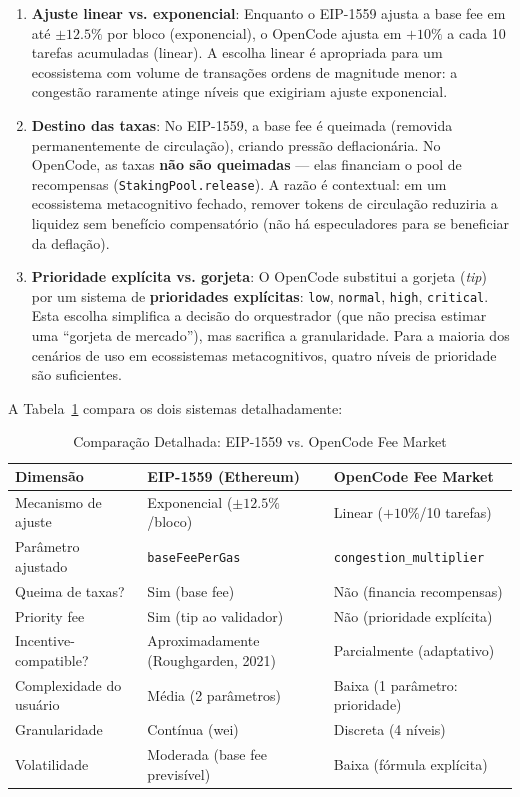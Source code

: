 \begin{enumerate}
    \item \textbf{Ajuste linear vs. exponencial}: Enquanto o EIP-1559 ajusta a base fee em até $\pm 12.5\%$ por bloco (exponencial), o OpenCode ajusta em $+10\%$ a cada 10 tarefas acumuladas (linear). A escolha linear é apropriada para um ecossistema com volume de transações ordens de magnitude menor: a congestão raramente atinge níveis que exigiriam ajuste exponencial.
    
    \item \textbf{Destino das taxas}: No EIP-1559, a base fee é queimada (removida permanentemente de circulação), criando pressão deflacionária. No OpenCode, as taxas \textbf{não são queimadas} --- elas financiam o pool de recompensas (\texttt{StakingPool.release}). A razão é contextual: em um ecossistema metacognitivo fechado, remover tokens de circulação reduziria a liquidez sem benefício compensatório (não há especuladores para se beneficiar da deflação).
    
    \item \textbf{Prioridade explícita vs. gorjeta}: O OpenCode substitui a gorjeta (\textit{tip}) por um sistema de \textbf{prioridades explícitas}: \texttt{low}, \texttt{normal}, \texttt{high}, \texttt{critical}. Esta escolha simplifica a decisão do orquestrador (que não precisa estimar uma ``gorjeta de mercado''), mas sacrifica a granularidade. Para a maioria dos cenários de uso em ecossistemas metacognitivos, quatro níveis de prioridade são suficientes.
\end{enumerate}

A Tabela~\ref{tab:eip1559_comparison_detailed} compara os dois sistemas detalhadamente:

\begin{table}[htbp]
\centering
\caption{Comparação Detalhada: EIP-1559 vs. OpenCode Fee Market}
\label{tab:eip1559_comparison_detailed}
\begin{tabular}{p{3cm}p{4cm}p{4cm}}
\hline
\textbf{Dimensão} & \textbf{EIP-1559 (Ethereum)} & \textbf{OpenCode Fee Market} \\
\hline
Mecanismo de ajuste & Exponencial ($\pm 12.5\%$/bloco) & Linear ($+10\%$/10 tarefas) \\
\hline
Parâmetro ajustado & \texttt{baseFeePerGas} & \texttt{congestion\_multiplier} \\
\hline
Queima de taxas? & Sim (base fee) & Não (financia recompensas) \\
\hline
Priority fee & Sim (tip ao validador) & Não (prioridade explícita) \\
\hline
Incentive-compatible? & Aproximadamente (Roughgarden, 2021) & Parcialmente (adaptativo) \\
\hline
Complexidade do usuário & Média (2 parâmetros) & Baixa (1 parâmetro: prioridade) \\
\hline
Granularidade & Contínua (wei) & Discreta (4 níveis) \\
\hline
Volatilidade & Moderada (base fee previsível) & Baixa (fórmula explícita) \\
\hline
\end{tabular}
\end{table}

